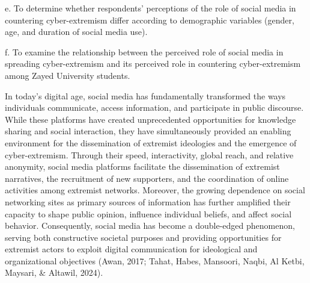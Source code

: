 \documentclass{NSP1}
\begin{document}
e. To determine whether respondents' perceptions of the role of social media in countering cyber-extremism differ according to demographic variables (gender, age, and duration of social media use).

f. To examine the relationship between the perceived role of social media in spreading cyber-extremism and its perceived role in countering cyber-extremism among Zayed University students.

\par\medskip{}\smallskip

\par\medskip{}\smallskip

In today's digital age, social media has fundamentally transformed the ways individuals communicate, access information, and participate in public discourse. While these platforms have created unprecedented opportunities for knowledge sharing and social interaction, they have simultaneously provided an enabling environment for the dissemination of extremist ideologies and the emergence of cyber-extremism. Through their speed, interactivity, global reach, and relative anonymity, social media platforms facilitate the dissemination of extremist narratives, the recruitment of new supporters, and the coordination of online activities among extremist networks. Moreover, the growing dependence on social networking sites as primary sources of information has further amplified their capacity to shape public opinion, influence individual beliefs, and affect social behavior. Consequently, social media has become a double-edged phenomenon, serving both constructive societal purposes and providing opportunities for extremist actors to exploit digital communication for ideological and organizational objectives (Awan, 2017; Tahat, Habes, Mansoori, Naqbi, Al Ketbi, Maysari, \& Altawil, 2024).
\end{document}
